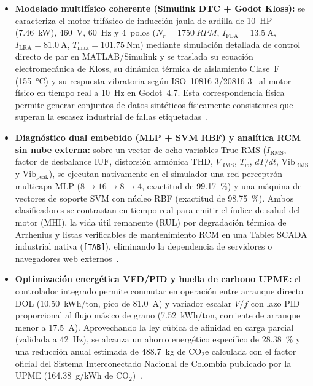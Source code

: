\begin{itemize}\setlength{\itemsep}{2pt}\setlength{\topsep}{2pt}
\item \textbf{Modelado multifísico coherente (Simulink DTC + Godot Kloss):} se caracteriza el motor trifásico de inducción jaula de ardilla de \qty{10}{HP} (\qty{7.46}{\kilo\watt}), \qty{460}{\volt}, \qty{60}{\hertz} y 4~polos ($N_r = \qty{1750}{RPM}$, $I_{\mathrm{FLA}} = \qty{13.5}{\ampere}$, $I_{\mathrm{LRA}} = \qty{81.0}{\ampere}$, $T_{\max} = \qty{101.75}{\newton\meter}$) mediante simulación detallada de control directo de par en MATLAB/Simulink y se traslada su ecuación electromecánica de Kloss, su dinámica térmica de aislamiento Clase~F (\qty{155}{\celsius}) y su respuesta vibratoria según ISO~10816-3/20816-3~\cite{ISO10816,ISO20816} al motor físico en tiempo real a \qty{10}{\hertz} en Godot~4.7. Esta correspondencia física permite generar conjuntos de datos sintéticos físicamente consistentes que superan la escasez industrial de fallas etiquetadas~\cite{AI2026,Thermal2025}.
\item \textbf{Diagnóstico dual embebido (MLP + SVM RBF) y analítica RCM sin nube externa:} sobre un vector de ocho variables True-RMS ($I_{\mathrm{RMS}}$, factor de desbalance $\mathrm{IUF}$, distorsión armónica $\mathrm{THD}$, $V_{\mathrm{RMS}}$, $T_w$, $dT/dt$, $\mathrm{Vib}_{\mathrm{RMS}}$ y $\mathrm{Vib}_{\mathrm{peak}}$), se ejecutan nativamente en el simulador una red perceptrón multicapa MLP ($8 \to 16 \to 8 \to 4$, exactitud de \qty{99.17}{\percent}) y una máquina de vectores de soporte SVM con núcleo RBF (exactitud de \qty{98.75}{\percent}). Ambos clasificadores se contrastan en tiempo real para emitir el índice de salud del motor (MHI), la vida útil remanente (RUL) por degradación térmica de Arrhenius y listas verificables de mantenimiento RCM en una Tablet SCADA industrial nativa (\texttt{[TAB]}), eliminando la dependencia de servidores o navegadores web externos~\cite{Fog2025,Soualhi2022}.
\item \textbf{Optimización energética VFD/PID y huella de carbono UPME:} el controlador integrado permite conmutar en operación entre arranque directo DOL (\qty{10.50}{kWh/ton}, pico de \qty{81.0}{\ampere}) y variador escalar $V/f$ con lazo PID proporcional al flujo másico de grano (\qty{7.52}{kWh/ton}, corriente de arranque menor a \qty{17.5}{\ampere}). Aprovechando la ley cúbica de afinidad en carga parcial (validada a \qty{42}{\hertz}), se alcanza un ahorro energético específico de \qty{28.38}{\percent} y una reducción anual estimada de \qty{488.7}{\kilo\gram} de $\mathrm{CO_2e}$ calculada con el factor oficial del Sistema Interconectado Nacional de Colombia publicado por la UPME (\qty{164.38}{g/kWh} de $\mathrm{CO_2}$)~\cite{UPME2024}.

\end{itemize}
